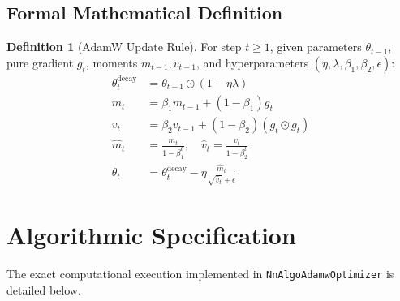\documentclass[11pt,a4paper]{article}
\theoremstyle{definition}
\newtheorem{definition}{Definition}[section]
\begin{document}
\subsection{Formal Mathematical Definition}
\begin{definition}[AdamW Update Rule]
For step $t \ge 1$, given parameters $\theta_{t-1}$, pure gradient $g_t$, moments $m_{t-1}, v_{t-1}$, and hyperparameters $(\eta, \lambda, \beta_1, \beta_2, \epsilon)$:
\begin{align}
\theta_t^{\text{decay}} &= \theta_{t-1} \odot (1 - \eta \lambda) \label{eq:adamw_decay} \\
m_t &= \beta_1 m_{t-1} + (1 - \beta_1) g_t \label{eq:adamw_m} \\
v_t &= \beta_2 v_{t-1} + (1 - \beta_2) (g_t \odot g_t) \label{eq:adamw_v} \\
\hat{m}_t &= \frac{m_t}{1 - \beta_1^t}, \quad \hat{v}_t = \frac{v_t}{1 - \beta_2^t} \label{eq:adamw_bc} \\
\theta_t &= \theta_t^{\text{decay}} - \eta \frac{\hat{m}_t}{\sqrt{\hat{v}_t} + \epsilon} \label{eq:adamw_update}
\end{align}
\end{definition}

\section{Algorithmic Specification}

The exact computational execution implemented in \texttt{NnAlgoAdamwOptimizer} is detailed below.
\end{document}
